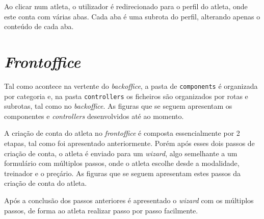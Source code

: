 Ao clicar num atleta, o utilizador é redirecionado para o perfil do atleta, onde este conta com várias abas. Cada aba é uma subrota do perfil, alterando apenas o conteúdo de cada aba.


\section{\textit{Frontoffice}}

Tal como acontece na vertente do \textit{backoffice}, a pasta de \texttt{components} é organizada por categoria e, na pasta \texttt{controllers} os ficheiros são organizados por rotas e subrotas, tal como no \textit{backoffice}. As figuras que se seguem apresentam os componentes e \textit{controllers} desenvolvidos até ao momento.

\begin{minipage}[t]{0.45\textwidth}
\end{minipage}
\begin{minipage}[t]{0.45\textwidth}
\end{minipage}

A criação de conta do atleta no \textit{frontoffice} é composta essencialmente por 2 etapas, tal como foi apresentado anteriormente. Porém após esses dois passos de criação de conta, o atleta é enviado para um \textit{wizard}, algo semelhante a um formulário com múltiplos passos, onde o atleta escolhe desde a modalidade, treinador e o preçário. As figuras que se seguem apresentam estes passos da criação de conta do atleta.

\begin{minipage}[t]{0.45\textwidth}
\end{minipage}
\begin{minipage}[t]{0.45\textwidth}
\end{minipage}

Após a conclusão dos passos anteriores é apresentado o \textit{wizard} com os múltiplos passos, de forma ao atleta realizar passo por passo facilmente.

